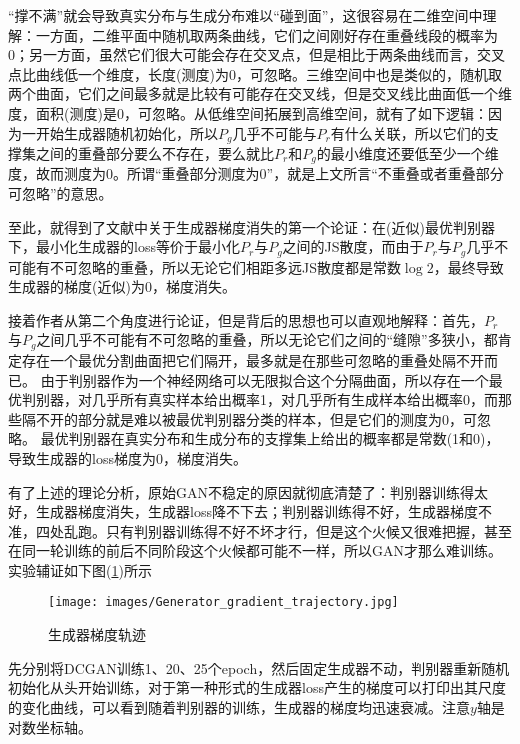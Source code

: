             \par
            “撑不满”就会导致真实分布与生成分布难以“碰到面”，这很容易在二维空间中理解：一方面，二维平面中随机取两条曲线，它们之间刚好存在重叠线段的概率为0；另一方面，虽然它们很大可能会存在交叉点，但是相比于两条曲线而言，交叉点比曲线低一个维度，长度(测度)为0，可忽略。三维空间中也是类似的，随机取两个曲面，它们之间最多就是比较有可能存在交叉线，但是交叉线比曲面低一个维度，面积(测度)是0，可忽略。从低维空间拓展到高维空间，就有了如下逻辑：因为一开始生成器随机初始化，所以$ P_g $几乎不可能与$P_r$有什么关联，所以它们的支撑集之间的重叠部分要么不存在，要么就比$ P_r $和$ P_g $的最小维度还要低至少一个维度，故而测度为0。所谓“重叠部分测度为0”，就是上文所言“不重叠或者重叠部分可忽略”的意思。
            \par
            至此，就得到了文献\cite{2017.Arjovsky}中关于生成器梯度消失的第一个论证：在(近似)最优判别器下，最小化生成器的loss等价于最小化$ P_r $与$ P_g $之间的JS散度，而由于$ P_r $与$ P_g $几乎不可能有不可忽略的重叠，所以无论它们相距多远JS散度都是常数$\log 2$，最终导致生成器的梯度(近似)为0，梯度消失。
            \par
            接着作者从第二个角度进行论证，但是背后的思想也可以直观地解释：首先，$P_r $与$ P_g $之间几乎不可能有不可忽略的重叠，所以无论它们之间的“缝隙”多狭小，都肯定存在一个最优分割曲面把它们隔开，最多就是在那些可忽略的重叠处隔不开而已。
            由于判别器作为一个神经网络可以无限拟合这个分隔曲面，所以存在一个最优判别器，对几乎所有真实样本给出概率1，对几乎所有生成样本给出概率0，而那些隔不开的部分就是难以被最优判别器分类的样本，但是它们的测度为0，可忽略。
            最优判别器在真实分布和生成分布的支撑集上给出的概率都是常数(1和0)，导致生成器的loss梯度为0，梯度消失。
            \par
            有了上述的理论分析，原始GAN不稳定的原因就彻底清楚了：判别器训练得太好，生成器梯度消失，生成器loss降不下去；判别器训练得不好，生成器梯度不准，四处乱跑。只有判别器训练得不好不坏才行，但是这个火候又很难把握，甚至在同一轮训练的前后不同阶段这个火候都可能不一样，所以GAN才那么难训练。实验辅证如下图(\ref{fig:生成器梯度轨迹})所示
                \begin{figure}[H]
                \centering
                \texttt{[image: images/Generator\_gradient\_trajectory.jpg]}
                \caption{生成器梯度轨迹}
                \label{fig:生成器梯度轨迹}
                \end{figure}
            先分别将DCGAN训练1、20、25个epoch，然后固定生成器不动，判别器重新随机初始化从头开始训练，对于第一种形式的生成器loss产生的梯度可以打印出其尺度的变化曲线，可以看到随着判别器的训练，生成器的梯度均迅速衰减。注意$y$轴是对数坐标轴。
